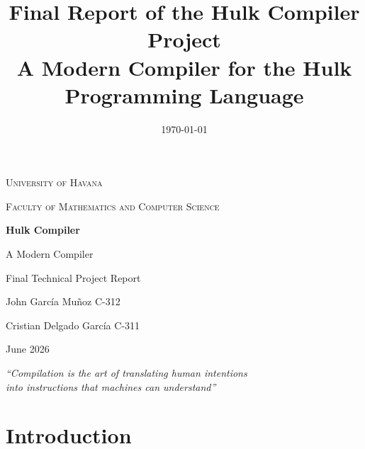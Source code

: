 \documentclass[12pt,a4paper]{report}
\title{
    \textbf{Final Report of the Hulk Compiler Project} \\
    \large A Modern Compiler for the Hulk Programming Language
}
\author{}
\date{\today}
\begin{document}
\begin{titlepage}
    \centering
    \vspace*{2cm}
    
    {\scshape\Large University of Havana \par}
    \vspace{0.5cm}
    {\scshape Faculty of Mathematics and Computer Science \par}
    
    \vspace{2cm}
    
    {\Huge\bfseries Hulk Compiler \par}
    \vspace{0.5cm}
    {\Large A Modern Compiler \par}
    
    \vspace{3cm}
    
    {\Large Final Technical Project Report \par}

    \vspace{1.5cm}

    {\large
    John García Muñoz C-312 \par
    Cristian Delgado García C-311 \par
    }

    \vspace{1.5cm}
    
    {\large June 2026 \par}
  
    \vfill
    
    {\large\itshape ``Compilation is the art of translating human intentions\\
    into instructions that machines can understand'' \par}
    
\end{titlepage}

\tableofcontents
\newpage

\chapter{Introduction}
\end{document}
